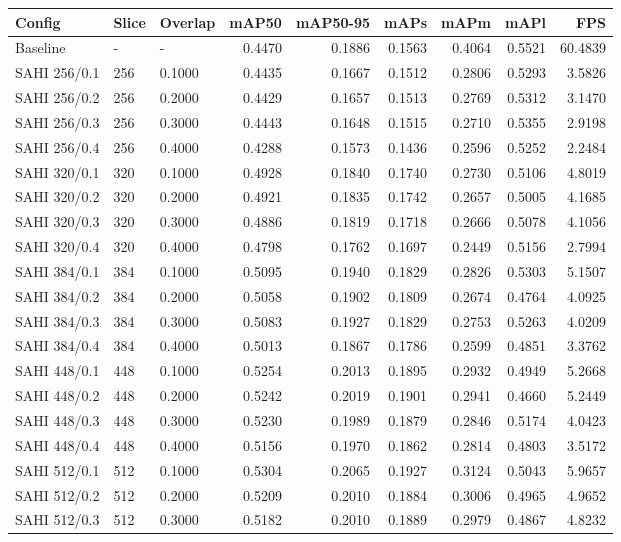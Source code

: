 \begin{tabular}{lllrrrrrr}
\toprule
Config & Slice & Overlap & mAP50 & mAP50-95 & mAPs & mAPm & mAPl & FPS \\
\midrule
Baseline & - & - & 0.4470 & 0.1886 & 0.1563 & 0.4064 & 0.5521 & 60.4839 \\
SAHI 256/0.1 & 256 & 0.1000 & 0.4435 & 0.1667 & 0.1512 & 0.2806 & 0.5293 & 3.5826 \\
SAHI 256/0.2 & 256 & 0.2000 & 0.4429 & 0.1657 & 0.1513 & 0.2769 & 0.5312 & 3.1470 \\
SAHI 256/0.3 & 256 & 0.3000 & 0.4443 & 0.1648 & 0.1515 & 0.2710 & 0.5355 & 2.9198 \\
SAHI 256/0.4 & 256 & 0.4000 & 0.4288 & 0.1573 & 0.1436 & 0.2596 & 0.5252 & 2.2484 \\
SAHI 320/0.1 & 320 & 0.1000 & 0.4928 & 0.1840 & 0.1740 & 0.2730 & 0.5106 & 4.8019 \\
SAHI 320/0.2 & 320 & 0.2000 & 0.4921 & 0.1835 & 0.1742 & 0.2657 & 0.5005 & 4.1685 \\
SAHI 320/0.3 & 320 & 0.3000 & 0.4886 & 0.1819 & 0.1718 & 0.2666 & 0.5078 & 4.1056 \\
SAHI 320/0.4 & 320 & 0.4000 & 0.4798 & 0.1762 & 0.1697 & 0.2449 & 0.5156 & 2.7994 \\
SAHI 384/0.1 & 384 & 0.1000 & 0.5095 & 0.1940 & 0.1829 & 0.2826 & 0.5303 & 5.1507 \\
SAHI 384/0.2 & 384 & 0.2000 & 0.5058 & 0.1902 & 0.1809 & 0.2674 & 0.4764 & 4.0925 \\
SAHI 384/0.3 & 384 & 0.3000 & 0.5083 & 0.1927 & 0.1829 & 0.2753 & 0.5263 & 4.0209 \\
SAHI 384/0.4 & 384 & 0.4000 & 0.5013 & 0.1867 & 0.1786 & 0.2599 & 0.4851 & 3.3762 \\
SAHI 448/0.1 & 448 & 0.1000 & 0.5254 & 0.2013 & 0.1895 & 0.2932 & 0.4949 & 5.2668 \\
SAHI 448/0.2 & 448 & 0.2000 & 0.5242 & 0.2019 & 0.1901 & 0.2941 & 0.4660 & 5.2449 \\
SAHI 448/0.3 & 448 & 0.3000 & 0.5230 & 0.1989 & 0.1879 & 0.2846 & 0.5174 & 4.0423 \\
SAHI 448/0.4 & 448 & 0.4000 & 0.5156 & 0.1970 & 0.1862 & 0.2814 & 0.4803 & 3.5172 \\
SAHI 512/0.1 & 512 & 0.1000 & 0.5304 & 0.2065 & 0.1927 & 0.3124 & 0.5043 & 5.9657 \\
SAHI 512/0.2 & 512 & 0.2000 & 0.5209 & 0.2010 & 0.1884 & 0.3006 & 0.4965 & 4.9652 \\
SAHI 512/0.3 & 512 & 0.3000 & 0.5182 & 0.2010 & 0.1889 & 0.2979 & 0.4867 & 4.8232 \\

\end{tabular}
